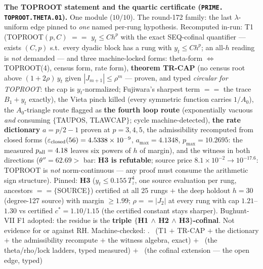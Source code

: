 \par\smallskip\noindent\textbf{The TOPROOT statement and the
quartic certificate (\texttt{PRIME.\allowbreak
TOPROOT.\allowbreak THETA.01}).}
One module ($10/10$).  The round-172 family: the last
$\lambda$-uniform edge pinned to \emph{one} named per-rung
hypothesis.  Recomputed in-run: T1 (TOPROOT$(p, C)$ $==$ $y_t
\le C h^p$ with the exact SEQ-cofinal quantifier --- exists
$(C, p)$ s.t.\ every dyadic block has a rung with $y_t \le
C h^p$; an all-$h$ reading is \emph{not} demanded --- and three
machine-locked forms: theta-form $\iff$ TOPROOT(4), census form,
rate form), \textbf{theorem TR-CAP} (no census root above
$(1 + 2\rho)\,y_t$ given $|J_{m+1}| \le \rho^m$ --- proven, and
typed \emph{circular for TOPROOT}: the cap is $y_t$-normalized;
Fujiwara's sharpest term $==$ the trace $B_1 + y_t$ exactly),
the Vieta pinch killed (every symmetric function carries
$1/A_0$), the $A_0$-triangle route flagged as \textbf{the fourth
loop route} (exponentially vacuous \emph{and} consuming
$\{$TAUPOS, TLAWCAP$\}$; cycle machine-detected), \textbf{the
rate dictionary} $a = p/2 - 1$ proven at $p = 3, 4, 5$, the
admissibility recomputed from closed forms
($\varepsilon_{\rm closed}(56) = 4.5338\times10^{-9}$, $a_{\max}
= 4.1348$, $p_{\max} = 10.2695$: the measured $p_{\rm all} =
4.18$ leaves six powers of $h$ of margin), and the witness in
both directions ($\theta'' = 62.69 >$ bar: \textbf{H3 is
refutable}; source price $8.1\times10^{-2} \to 10^{-17.6}$:
TOPROOT is \emph{not} norm-continuous --- any proof must consume
the arithmetic sign structure).  Pinned: \textbf{H3} ($y_t \le
0.155\,T_z^4$, one source evaluation per rung, ancestors $==
\{$SOURCE$\}$) certified at all 25 rungs $+$ the deep holdout
$h = 30$ (degree-127 source) with margin $\ge 1.99$; $\rho ==
|J_2|$ at every rung with cap $1.21$--$1.30$ vs certified $c^* =
1.10/1.15$ (the certified constant stays sharper).  Bughunt-VII
F1 adopted: the residue is the \textbf{triple $\{$H1 $\wedge$ H2
$\wedge$ H3$\}$-cofinal}.  Not evidence for or against RH.
Machine-checked: .
\mE\ (T1 $+$ TR-CAP $+$ the dictionary $+$ the admissibility
recompute $+$ the witness algebra, exact) $+$ \mC\ (the
theta/rho/lock ladders, typed measured) $+$ \mO\ (the cofinal
extension --- the open edge, typed)
\par\smallskip


